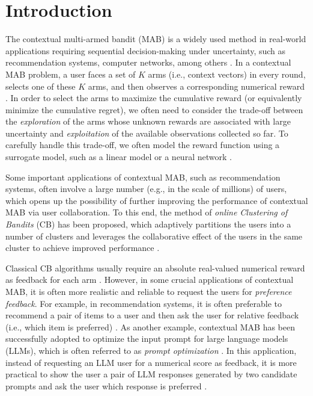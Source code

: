 \section{Introduction}

The contextual multi-armed bandit (MAB) is a widely used method in real-world applications requiring sequential decision-making under uncertainty, such as recommendation systems, computer networks, among others \cite{li2010contextual}.
In a contextual MAB problem, a user faces a set of $K$ arms (i.e., context vectors) in every round, selects one of these $K$ arms, and then observes a corresponding numerical reward \cite{lattimore2020bandit}.
In order to select the arms to maximize the cumulative reward (or equivalently minimize the cumulative regret), we often need to consider the trade-off between the \emph{exploration} of the arms whose unknown rewards are associated with large uncertainty and \emph{exploitation} of the available observations collected so far.
To carefully handle this trade-off, we often model the reward function using a surrogate model, such as a linear model \cite{chu2011contextual} or a neural network \cite{zhou2020neural}.

Some important applications of contextual MAB, such as recommendation systems, often involve a large number (e.g., in the scale of millions) of users, which opens up the possibility of further improving the performance of contextual MAB via user collaboration.
To this end, the method of \emph{online Clustering of Bandits} (CB) has been proposed, which adaptively partitions the users into a number of clusters and leverages the collaborative effect of the users in the same cluster to achieve improved performance \cite{gentile2014online,wang2024onlinea,10.5555/3367243.3367445}.

Classical CB algorithms usually require an absolute real-valued numerical reward as feedback for each arm \cite{wang2024onlinea}. However, in some crucial applications of contextual MAB, it is often more realistic and reliable to request the users for \emph{preference feedback}.
For example, in recommendation systems, it is often preferable to recommend a pair of items to a user and then ask the user for relative feedback (i.e., which item is preferred) \cite{JCSS12_yue2012k}.
As another example, contextual MAB has been successfully adopted to optimize the input prompt for large language models (LLMs), which is often referred to as \emph{prompt optimization} \cite{lin2024prompt,lin2023instinct}.
In this application, instead of requesting an LLM user for a numerical score as feedback, it is more practical to show the user a pair of LLM responses generated by two candidate prompts and ask the user which response is preferred \cite{lin2024prompt,verma2024neural}.

